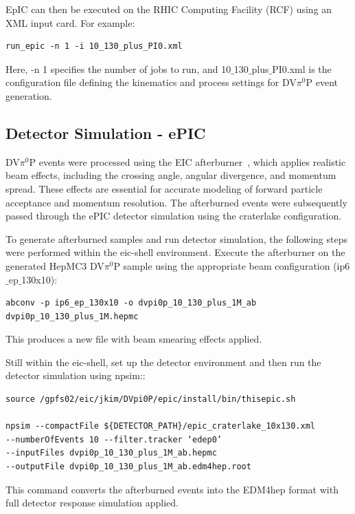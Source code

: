 \documentclass[letterpaper,12pt]{article}
\begin{document}
EpIC can then be executed on the RHIC Computing Facility (RCF) using an XML input card. For example:
\begin{verbatim}
run_epic -n 1 -i 10_130_plus_PI0.xml
\end{verbatim}
Here, -n 1 specifies the number of jobs to run, and 10$\_$130$\_$plus$\_$PI0.xml is the configuration file defining the kinematics and process settings for DV$\pi^0$P event generation.

\subsection{Detector Simulation - ePIC}\label{subsec:DetSim}
DV$\pi^0$P events were processed using the EIC afterburner~\cite{afterburner_github}, which applies realistic beam effects, including the crossing angle, angular divergence, and momentum spread. These effects are essential for accurate modeling of forward particle acceptance and momentum resolution. The afterburned events were subsequently passed through the ePIC detector simulation using the craterlake configuration.

To generate afterburned samples and run detector simulation, the following steps were performed within the eic-shell environment.
Execute the afterburner on the generated HepMC3 DV$\pi^0$P sample using the appropriate beam configuration (ip6$\_$ep$\_$130x10):
\begin{verbatim}
abconv -p ip6_ep_130x10 -o dvpi0p_10_130_plus_1M_ab 
dvpi0p_10_130_plus_1M.hepmc
\end{verbatim}
This produces a new file with beam smearing effects applied.

Still within the eic-shell, set up the detector environment and then run the detector simulation using npsim::
\begin{verbatim}
source /gpfs02/eic/jkim/DVpi0P/epic/install/bin/thisepic.sh

npsim --compactFile ${DETECTOR_PATH}/epic_craterlake_10x130.xml  
--numberOfEvents 10 --filter.tracker ‘edep0’ 
--inputFiles dvpi0p_10_130_plus_1M_ab.hepmc 
--outputFile dvpi0p_10_130_plus_1M_ab.edm4hep.root
\end{verbatim}
This command converts the afterburned events into the EDM4hep format with full detector response simulation applied.
\end{document}
